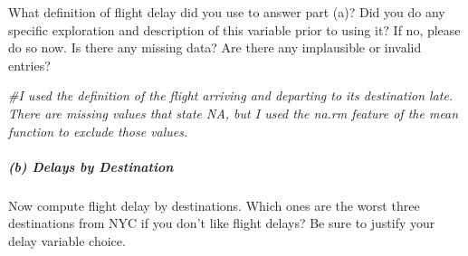 \documentclass[
]{article}
\newenvironment{Shaded}{\begin{snugshade}}{\end{snugshade}}
\newcommand{\AttributeTok}[1]{\textcolor[rgb]{0.77,0.63,0.00}{#1}}
\newcommand{\CommentTok}[1]{\textcolor[rgb]{0.56,0.35,0.01}{\textit{#1}}}
\newcommand{\ConstantTok}[1]{\textcolor[rgb]{0.00,0.00,0.00}{#1}}
\newcommand{\FunctionTok}[1]{\textcolor[rgb]{0.00,0.00,0.00}{#1}}
\newcommand{\NormalTok}[1]{#1}
\newcommand{\OtherTok}[1]{\textcolor[rgb]{0.56,0.35,0.01}{#1}}
\newcommand{\SpecialCharTok}[1]{\textcolor[rgb]{0.00,0.00,0.00}{#1}}
\begin{document}
What definition of flight delay did you use to answer part (a)? Did you
do any specific exploration and description of this variable prior to
using it? If no, please do so now. Is there any missing data? Are there
any implausible or invalid entries?

\begin{Shaded}
\begin{Highlighting}[]
\CommentTok{\#I used the definition of the flight arriving and departing to its destination late. There are missing values that state NA, but I used the na.rm feature of the mean function to exclude those values. }
\end{Highlighting}
\end{Shaded}

\hypertarget{b-delays-by-destination}{%
\subparagraph{(b) Delays by Destination}\label{b-delays-by-destination}}

Now compute flight delay by destinations. Which ones are the worst three
destinations from NYC if you don't like flight delays? Be sure to
justify your delay variable choice.

\begin{Shaded}
\end{Shaded}
\end{document}
